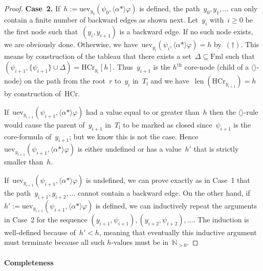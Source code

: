 \documentclass{entcs}
\newcommand{\Natp}{{\mathbb N_{>0}}}
\newcommand{\pea}[2]{\langle#1\rangle #2}
\newcommand{\prp}[1]{#1*}
\newcommand{\fml}{\mathrm{Fml}}
\newcommand{\thc}{\mathrm{HCr}}
\newcommand{\tuev}{\mathrm{uev}}
\newcommand{\trea}{$\langle\rangle$}
\newcommand{\llen}{\mathop{\mathrm{len}}}
\newcommand{\tl}{T_{\mathrm{l}}}
\begin{document}
\begin{proof}
  \noindent{}\textbf{Case~2.} If~$h := \tuev_{y_0}(\psi_0, \pea{\prp{\alpha}}{\varphi})$ is defined,
  the path~$y_0, y_1, \dotsc$ can only contain a finite number of backward edges as shown next.
  Let~$y_i$ with~$i \geq 0$ be the first node
  such that~$(y_i, y_{i+1})$ is a backward edge.
  If no such node exists, we are obviously done.
  Otherwise, we have~$\tuev_{y_i}(\psi_i, \pea{\prp{\alpha}}{\varphi}) = h$ by~$(\dagger)$.
  This means by construction of the tableau
  that there exists a set~$\Delta \subseteq \fml$ such that~$(\psi_{i+1}, \{ \psi_{i+1} \} \cup \Delta) = \thc_{y_i}[h]$.
  Thus~$y_{i+1}$ is the $h^{\mathrm{th}}$ core-node (child of a \trea{}-node)
  on the path from the root~$r$ to~$y_i$ in~$\tl$
  and we have~$\llen(\thc_{y_{i+1}}) = h$ by construction of~$\thc$.

  If~$\tuev_{y_{i+1}}(\psi_{i+1}, \pea{\prp{\alpha}}{\varphi})$ had a value equal to or greater than~$h$
  then the \trea{}-rule would cause the parent of~$y_{i+1}$ in~$\tl$
  to be marked as closed
  since~$\psi_{i+1}$ is the core-formula of~$y_{i+1}$;
  but we know this is not the case.
  Hence~$\tuev_{y_{i+1}}(\psi_{i+1}, \pea{\prp{\alpha}}{\varphi})$ is either undefined or
  has a value~$h'$ that is strictly smaller than~$h$.

  If~$\tuev_{y_{i+1}}(\psi_{i+1}, \pea{\prp{\alpha}}{\varphi})$ is undefined,
  we can prove exactly as in Case~1 that the path~$y_{i+1}, y_{i+2}, \dotsc$ cannot contain a backward edge.
  On the other hand,
  if~$h' := \tuev_{y_{i+1}}(\psi_{i+1}, \pea{\prp{\alpha}}{\varphi})$ is defined,
  we can inductively repeat the arguments in Case~2
  for the sequence $(y_{i+1}, \psi_{i+1}), (y_{i+2}, \psi_{i+2}), \dotsc$.
  The induction is well-defined because of~$h' < h$,
  meaning that eventually this inductive argument must terminate
  because all such $h$-values must be in~$\Natp$.
\end{proof}

\paragraph{\bf Completeness}
\end{document}
